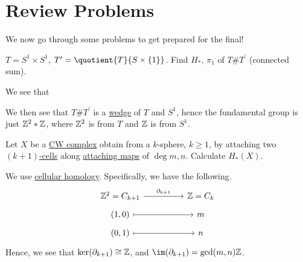 \section{Review Problems}
We now go through some problems to get prepared for the final!
\begin{exercise}[QR May 2019]
	\(T = S^1 \times S^1\), \(T^\prime = \quotient{T}{S \times \{1\}} \). Find \(H_\ast\), \(\pi _1\) of \(T \# T^\prime \) (connected sum).
\end{exercise}
\begin{answer}
	We see that
	\begin{figure}[H]
		\centering
		\label{fig:ans:ex-1:lec-40}
	\end{figure}
	We then see that \(T\# T^\prime \) is a \hyperref[CW-complex-wedge-sum]{wedge} of \(T\) and \(S^1\), hence the fundamental group is just
	\(\mathbb{\MakeUppercase{z}} ^{2} \ast \mathbb{\MakeUppercase{z}} \), where \(\mathbb{\MakeUppercase{z}} ^{2} \) is from \(T\) and \(\mathbb{\MakeUppercase{z}} \)
	is from \(S^{1} \).
\end{answer}

\begin{exercise}[QR Aug. 2019]
	Let \(X\) be a \hyperref[def:CW-Complex]{CW complex} obtain from a \(k\)-sphere, \(k\geq 1\), by attaching two \hyperref[def:cell]{\((k+1)\)-cells}
	along \hyperref[def:attaching-map]{attaching maps} of \(\deg m, n\). Calculate \(H_\ast (X)\).
\end{exercise}
\begin{answer}
	We use \hyperref[def:cellular-homology-group]{cellular homology}. Specifically, we have the following.
	\[\begin{tikzcd}[row sep=tiny]
			{\mathbb{Z}^2=C_{k+1}} && {\mathbb{Z}=C_k} \\
			{(1, 0)} && m \\
			{(0, 1)} && n
			\arrow[maps to, from=2-1, to=2-3]
			\arrow[maps to, from=3-1, to=3-3]
			\arrow["{\partial_{k+1}}", from=1-1, to=1-3]
		\end{tikzcd}\]
	Hence, we see that \(\ker(\partial _{k+1}) \cong \mathbb{\MakeUppercase{z}} \), and \(\im(\partial _{k+1}) = \gcd(m, n)\mathbb{\MakeUppercase{z}} \).
\end{answer}

